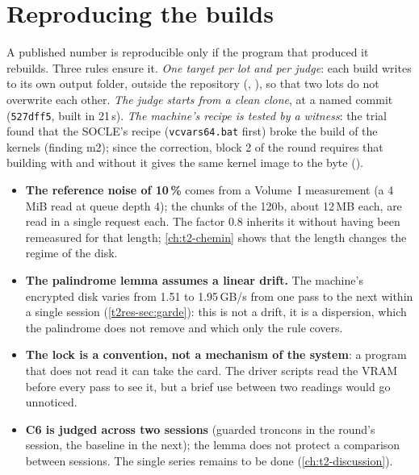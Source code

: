 \section{Reproducing the builds}\label{t2ann:sec:construction}

A published number is reproducible only if the program that produced it rebuilds. Three rules ensure it. \emph{One target per lot and per judge}: each build writes to its own output folder, outside the repository (, ), so that two lots do not overwrite each other. \emph{The judge starts from a clean clone}, at a named commit (\texttt{527dff5}, built in 21\,s). \emph{The machine's recipe is tested by a witness}: the trial found that the SOCLE's recipe (\texttt{vcvars64.bat} first) broke the build of the kernels (finding m2); since the correction, block 2 of the round requires that building with and without it gives the same kernel image to the byte ().

\begin{faux}
\begin{itemize}
\item \textbf{The reference noise of 10\,\%} comes from a Volume~I measurement (a 4\,MiB read at queue depth 4); the chunks of the 120b, about 12\,MB each, are read in a single request each. The factor $0.8$ inherits it without having been remeasured for that length; \cref{ch:t2-chemin} shows that the length changes the regime of the disk.
\item \textbf{The palindrome lemma assumes a linear drift.} The machine's encrypted disk varies from 1.51 to 1.95\,GB/s from one pass to the next within a single session (\cref{t2res-sec:garde}): this is not a drift, it is a dispersion, which the palindrome does not remove and which only the rule covers.
\item \textbf{The lock is a convention, not a mechanism of the system}: a program that does not read it can take the card. The driver scripts read the VRAM before every pass to see it, but a brief use between two readings would go unnoticed.
\item \textbf{C6 is judged across two sessions} (guarded troncons in the round's session, the baseline in the next); the lemma does not protect a comparison between sessions. The single series remains to be done (\cref{ch:t2-discussion}).
\end{itemize}
\end{faux}
